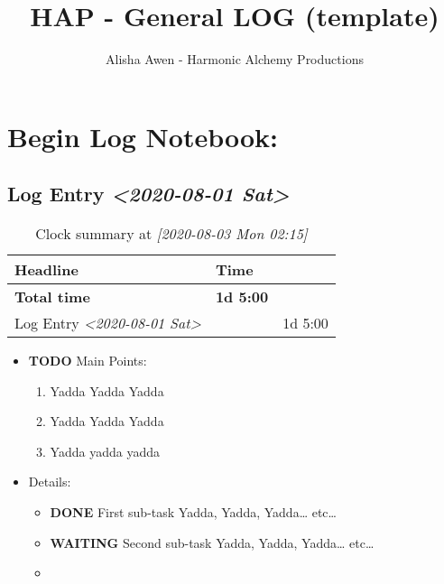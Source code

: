\documentclass[11pt]{article}
\author{Alisha Awen - Harmonic Alchemy Productions}
\date{}
\title{HAP - General LOG (template)}
\begin{document}
\maketitle

\section*{Begin Log Notebook:}
\label{sec:org44c80a7}

\subsection*{Log Entry \textit{<2020-08-01 Sat>}}
\label{sec:orgb96f5d3}
\begin{table}[htbp]
\caption[\#+TI]{Clock summary at \textit{[2020-08-03 Mon 02:15]}}
\centering
\begin{tabular}{lll}
Headline & Time & \\
\hline
\textbf{Total time} & \textbf{1d 5:00} & \\
\hline
\hspace*{1.0em}Log Entry \textit{<2020-08-01 Sat>} &  & 1d 5:00\\
\end{tabular}
\end{table}

\begin{itemize}
\item {\bfseries\sffamily TODO} Main Points:
\label{sec:org1ec0126}

\begin{enumerate}
\item Yadda Yadda Yadda
\item Yadda Yadda Yadda
\item Yadda yadda yadda
\end{enumerate}

\item Details:
\label{sec:orgdcda0bc}

\begin{itemize}
\item {\bfseries\sffamily DONE} First sub-task
\label{sec:orga311c53}
Yadda, Yadda, Yadda\ldots{} etc\ldots{}

\item {\bfseries\sffamily WAITING} Second sub-task
\label{sec:orgc1e16ac}
Yadda, Yadda, Yadda\ldots{} etc\ldots{}
\item 
\label{sec:org17a688e}
\end{itemize}
\end{itemize}
\end{document}
